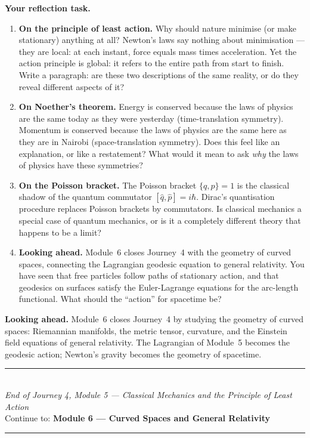 \documentclass[12pt,a4paper]{article}
\begin{document}
\begin{reflectionbox}
\textbf{Your reflection task.}

\begin{enumerate}
  \item \textbf{On the principle of least action.} Why should nature minimise (or make stationary) anything at all? Newton's laws say nothing about minimisation --- they are local: at each instant, force equals mass times acceleration. Yet the action principle is global: it refers to the entire path from start to finish. Write a paragraph: are these two descriptions of the same reality, or do they reveal different aspects of it?

  \item \textbf{On Noether's theorem.} Energy is conserved because the laws of physics are the same today as they were yesterday (time-translation symmetry). Momentum is conserved because the laws of physics are the same here as they are in Nairobi (space-translation symmetry). Does this feel like an explanation, or like a restatement? What would it mean to ask \emph{why} the laws of physics have these symmetries?

  \item \textbf{On the Poisson bracket.} The Poisson bracket $\{q,p\}=1$ is the classical shadow of the quantum commutator $[\hat q,\hat p]=i\hbar$. Dirac's quantisation procedure replaces Poisson brackets by commutators. Is classical mechanics a special case of quantum mechanics, or is it a completely different theory that happens to be a limit?

  \item \textbf{Looking ahead.} Module~6 closes Journey~4 with the geometry of curved spaces, connecting the Lagrangian geodesic equation to general relativity. You have seen that free particles follow paths of stationary action, and that geodesics on surfaces satisfy the Euler-Lagrange equations for the arc-length functional. What should the ``action'' for spacetime be?
\end{enumerate}
\end{reflectionbox}

\medskip
\noindent\textbf{Looking ahead.}
Module~6 closes Journey~4 by studying the geometry of curved spaces: Riemannian manifolds, the metric tensor, curvature, and the Einstein field equations of general relativity. The Lagrangian of Module~5 becomes the geodesic action; Newton's gravity becomes the geometry of spacetime.

\vspace{1.4cm}
\begin{center}
{\color{MidBlue}\rule{0.5\linewidth}{0.8pt}}\\[6pt]
{\small\color{DarkGrey}\textit{End of Journey 4, Module 5 --- Classical Mechanics and the Principle of Least Action}}\\[4pt]
{\small\color{DarkGrey}Continue to: \textbf{Module 6 --- Curved Spaces and General Relativity}}\\[6pt]
{\color{MidBlue}\rule{0.5\linewidth}{0.8pt}}
\end{center}
\end{document}
